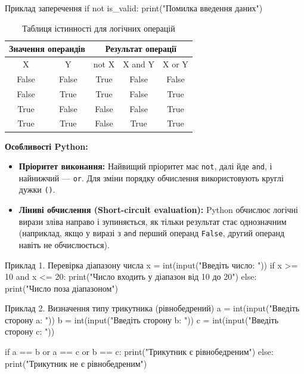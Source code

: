 \begin{py}{Приклад заперечення}
if not is_valid:
    print("Помилка введення даних")
\end{py}

\vspace{0.5em}

\begin{table}[htbp]
	\centering
	\caption{Таблиця істинності для логічних операцій}
	\begin{tabular}{|c|c|c|c|c|}
		\hline
		\multicolumn{2}{|c|}{Значення операндів} & \multicolumn{3}{c|}{Результат операції} \\ \hline
		X & Y & not X & X and Y & X or Y \\ \hline
		False & False & True  & False   & False  \\ \hline
		False & True  & True  & False   & True   \\ \hline
		True  & False & False & False   & True   \\ \hline
		True  & True  & False & True    & True   \\ \hline
	\end{tabular}
\end{table}

\vspace{0.5em}

\textbf{Особливості Python:}
\begin{itemize}
	\item \textbf{Пріоритет виконання:} Найвищий пріоритет має \texttt{not}, далі йде \texttt{and}, і найнижчий — \texttt{or}. Для зміни порядку обчислення використовують круглі дужки \texttt{()}.
	\item \textbf{Ліниві обчислення (Short-circuit evaluation):} Python обчислює логічні вирази зліва направо і зупиняється, як тільки результат стає однозначним (наприклад, якщо у виразі з \texttt{and} перший операнд \texttt{False}, другий операнд навіть не обчислюється).
\end{itemize}




\begin{py}{Приклад 1. Перевірка діапазону числа}
x = int(input("Введіть число: "))
if x >= 10 and x <= 20:
    print("Число входить у діапазон від 10 до 20")
else:
    print("Число поза діапазоном")
\end{py}


\begin{py}{Приклад 2. Визначення типу трикутника (рівнобедрений)}
a = int(input("Введіть сторону a: "))
b = int(input("Введіть сторону b: "))
c = int(input("Введіть сторону c: "))

if a == b or a == c or b == c:
    print("Трикутник є рівнобедреним")
else:
    print("Трикутник не є рівнобедреним")
\end{py}



